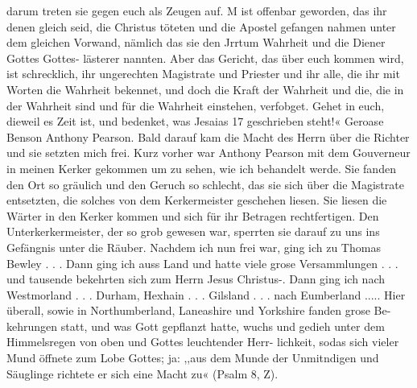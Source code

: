 darum treten sie gegen euch als Zeugen auf. M ist offenbar
geworden, das ihr denen gleich seid, die Christus töteten und die
Apostel gefangen nahmen unter dem gleichen Vorwand, nämlich
das sie den Jrrtum Wahrheit und die Diener Gottes Gottes-
lästerer nannten. Aber das Gericht, das über euch kommen wird,
ist schrecklich, ihr ungerechten Magistrate und Priester und ihr
alle, die ihr mit Worten die Wahrheit bekennet, und doch die
Kraft der Wahrheit und die, die in der Wahrheit sind und für die
Wahrheit einstehen, verfobget. Gehet in euch, dieweil es Zeit
ist, und bedenket, was Jesaias 17 geschrieben steht!«
Geroase Benson
Anthony Pearson.
Bald darauf kam die Macht des Herrn über die Richter
und sie setzten mich frei. Kurz vorher war Anthony Pearson
mit dem Gouverneur in meinen Kerker gekommen um zu sehen,
wie ich behandelt werde. Sie fanden den Ort so gräulich und
den Geruch so schlecht, das sie sich über die Magistrate entsetzten,
die solches von dem Kerkermeister geschehen liesen. Sie liesen
die Wärter in den Kerker kommen und sich für ihr Betragen
rechtfertigen. Den Unterkerkermeister, der so grob gewesen war,
sperrten sie darauf zu uns ins Gefängnis unter die Räuber.
Nachdem ich nun frei war, ging ich zu Thomas Bewley . . .
Dann ging ich auss Land und hatte viele grose Versammlungen . . .
und tausende bekehrten sich zum Herrn Jesus Christus-.
Dann ging ich nach Westmorland . . . Durham, Hexhain . . .
Gilsland . . . nach Eumberland ..... Hier überall, sowie in
Northumberland, Laneashire und Yorkshire fanden grose Be-
kehrungen statt, und was Gott gepflanzt hatte, wuchs und gedieh
unter dem Himmelsregen von oben und Gottes leuchtender Herr-
lichkeit, sodas sich vieler Mund öffnete zum Lobe Gottes; ja: ,,aus
dem Munde der Unmitndigen und Säuglinge richtete er sich eine
Macht zu« (Psalm 8, Z).


